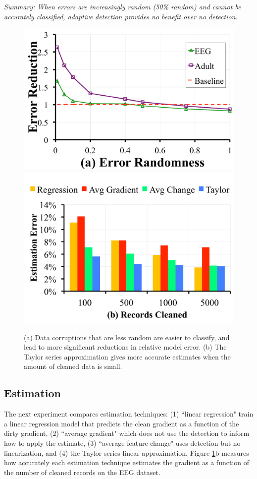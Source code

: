 \vspace{0.25em}

\noindent \emph{Summary: When errors are increasingly random (50\% random) and cannot be accurately classified, adaptive detection provides no benefit over no detection. }

\begin{figure}[ht!]
\vspace{-1em}
\centering
 \includegraphics[width=0.49\columnwidth]{exp/exp5a.pdf}
 \includegraphics[width=0.49\columnwidth]{exp/exp12.pdf}
 \caption{(a) Data corruptions that are less random are easier to classify, and lead to more significant reductions in relative model error. (b) The Taylor series approximation gives more accurate estimates when the amount of cleaned data is small. \label{tradeoffs2}}
\end{figure}

\subsection{Estimation}\label{est}
The next experiment compares estimation techniques: (1) ``linear regression" train a linear regression model that predicts the clean gradient as a function of the dirty gradient, (2) ``average gradient" which does not use the detection to inform how to apply the estimate, (3) ``average feature change" uses detection but no linearization, and (4) the Taylor series linear approximation.
Figure \ref{tradeoffs2}b measures how accurately each estimation technique estimates the gradient as a function of the number of cleaned records on the EEG dataset.

